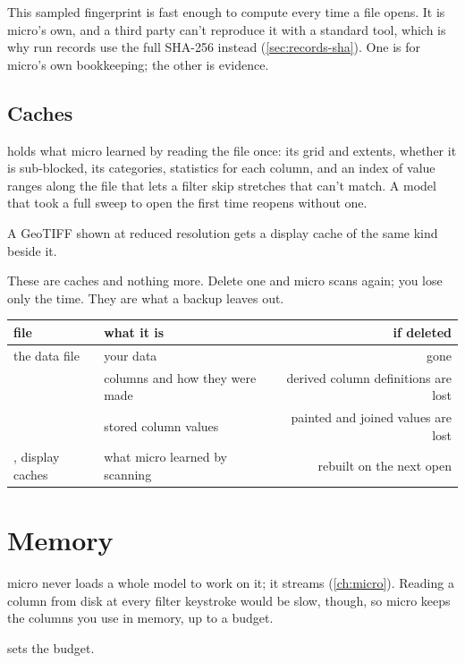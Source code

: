 \begin{why}
This sampled fingerprint is fast enough to compute every time a file opens. It is micro's own, and a third party can't reproduce it with a standard tool, which is why run records use the full SHA-256 instead (\cref{sec:records-sha}). One is for micro's own bookkeeping; the other is evidence.
\end{why}

\subsection{Caches}\label{sec:store-caches}
 holds what micro learned by reading the file once: its grid and extents, whether it is sub-blocked, its categories, statistics for each column, and an index of value ranges along the file that lets a filter skip stretches that can't match. A model that took a full sweep to open the first time reopens without one.

A GeoTIFF shown at reduced resolution gets a display cache of the same kind beside it.

These are caches and nothing more. Delete one and micro scans again; you lose only the time. They are what a  backup leaves out.

\begin{tabularx}{\linewidth}{@{}lMD@{}}\toprule
file & what it is & if deleted \\ \midrule
the data file & your data & gone \\
 & columns and how they were made & derived column definitions are lost \\
 & stored column values & painted and joined values are lost \\
, display caches & what micro learned by scanning & rebuilt on the next open \\
\bottomrule
\end{tabularx}

\section{Memory}\label{sec:store-memory}
micro never loads a whole model to work on it; it streams (\cref{ch:micro}). Reading a column from disk at every filter keystroke would be slow, though, so micro keeps the columns you use in memory, up to a budget.

 sets the budget.

